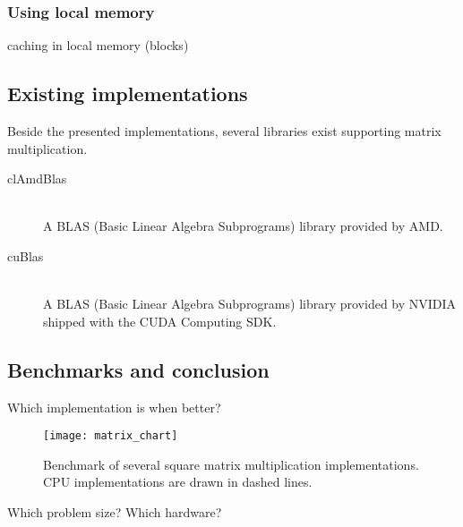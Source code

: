 \subsubsection{Using local memory}
caching in local memory (blocks)

\subsection{Existing implementations}

Beside the presented implementations, several libraries exist supporting matrix multiplication.

\begin{description}
   \item[clAmdBlas] \hfill \\
   A BLAS (Basic Linear Algebra Subprograms) library provided by AMD.
   \item[cuBlas] \hfill \\
   A BLAS (Basic Linear Algebra Subprograms) library provided by NVIDIA shipped with the CUDA Computing SDK.
\end{description}

\subsection{Benchmarks and conclusion}
Which implementation is when better?

\begin{figure}
\centering
\texttt{[image: matrix\_chart]}
\caption{Benchmark of several square matrix multiplication implementations. CPU implementations are drawn in dashed lines.}
\label{fig:matrix_chart}
\end{figure}

Which problem size?
Which hardware?

